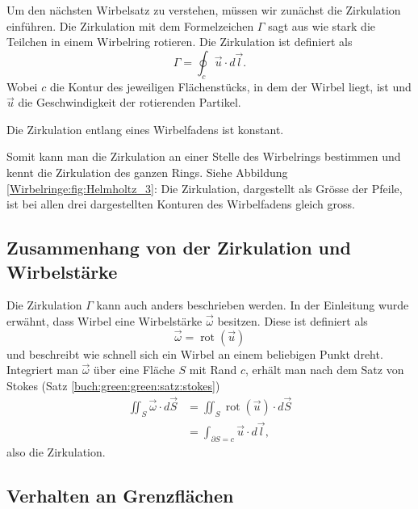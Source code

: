 Um den nächsten Wirbelsatz zu verstehen, müssen wir zunächst die Zirkulation einführen.
Die Zirkulation mit dem Formelzeichen \(\Gamma\) sagt aus wie stark die Teilchen in einem Wirbelring rotieren.
Die Zirkulation ist definiert als 
\begin{equation}
    \label{Wirbelringe:eq:Zirkulation}
    \Gamma
    = 
    \oint_{c} \vec{u} \cdot d \vec{l}.
\end{equation}
Wobei \(c\) die Kontur des jeweiligen Flächenstücks, in dem der Wirbel liegt, ist und \(\vec{u}\) die Geschwindigkeit der rotierenden Partikel.

\begin{satz}
    \label{Wirbelringe:satz:wirbelsatz3}
    Die Zirkulation entlang eines Wirbelfadens ist konstant. 
\end{satz}

Somit kann man die Zirkulation an einer Stelle des Wirbelrings bestimmen und kennt die Zirkulation des ganzen Rings.
Siehe Abbildung \ref{Wirbelringe:fig:Helmholtz_3}: 
Die Zirkulation, dargestellt als Grösse der Pfeile, ist bei allen drei dargestellten Konturen des Wirbelfadens gleich gross.

\subsection{Zusammenhang von der Zirkulation und Wirbelstärke\label{Wirbelringe:Stokes}}

Die Zirkulation \(\Gamma\) kann auch anders beschrieben werden. 
In der Einleitung wurde erwähnt, dass Wirbel eine Wirbelstärke \(\vec{\omega}\) besitzen.
Diese ist definiert als
\[
\vec{\omega}
=
\operatorname{rot}(\vec{u})
\]
und beschreibt wie schnell sich ein Wirbel an einem beliebigen Punkt dreht.
Integriert man \(\vec{\omega}\) über eine Fläche \(S\) mit Rand \(c\), erhält man nach dem Satz von Stokes (Satz \ref{buch:green:green:satz:stokes})
\begin{align*}
\iint_{S} \vec{\omega} \cdot d \vec{S}
&=
\iint_{S} \operatorname{rot}(\vec{u})\cdot  d \vec{S}\\
&=
\int_{\partial S = c} \vec{u} \cdot d\vec{l},
\end{align*}
also die Zirkulation.

\subsection{Verhalten an Grenzflächen\label{Wirbelringe:Grenzflaechen}}

